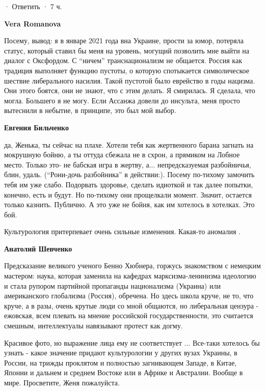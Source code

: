 \begin{itemize}
\begin{itemize}
 · Ответить · 7 ч.

\textbf{Vera Romanova} 

Посему, вывод: я в январе 2021 года вна Украине, прости за юмор, потеряла
статус, который ставил бы меня на уровень, могущий позволить мне выйти на
диалог с Оксфордом. С \enquote{ничем} транснационализм не общается. Россия как традиция
выполняет функцию пустоты, о которую спотыкается символическое шествие
либерального насилия. Такой пустотой было еврейство в годы нацизма. Они этого
боятся, они не знают, что с этим делать. Я смирилась. Я сделала, что могла.
Большего я не могу. Если Ассанжа довели до инсульта, меня просто вытеснили в
небытие, в принципе, это был мой выбор.

\textbf{Евгения Бильченко} 

да, Женька, ты сейчас на плахе. Хотели тебя как жертвенного барана загнать на
мокрушную бойню, а ты оттуда сбежала не в схрон, а прямиком на Лобное место.
Только это- не бабская игра в жертву, а... непредсказуемая
разбойничья, блин, удаль. (\enquote{Рони-дочь разбойника} в действии:). Посему по-тихому
замочить тебя им уже слабо. Подорвать здоровье, сделать идиоткой и так далее
попытки, конечно, есть и будут. Но по-тихому они прощелкали момент. Значит,
остается только казнить. Публично. А это уже не бойня, как им хотелось в
хотелках. Это бой.

\end{itemize} %

Культурология притерпевает очень сильные изменения.
Какая-то аномалия .

\begin{itemize} %
\textbf{Анатолий Шевченко} 

Предсказание великого ученого Бенно Хюбнера, горжусь знакомством с немецким
мастером: наука, которая заменила на кафедрах марксизма-ленинизма идеологию и
стала рупором партийной пропаганды национализма (Украина) или американского
глобализма (Россия), обречена. Но здесь школа круче, не то, что круче, а в
разы, очень крутые люди со мной общаются, но либеральная цензура - ежовская,
всем плевать на мнение российской государственности, это считается смешным,
интеллектуалы навязывают протест как догму.

\end{itemize} %


Красивое фото, но выражение лица ему не соответствует ... Все-таки хотелось бы
узнать - какое значение придают культурологии у других вузах Украины, в России,
на трижды проклятом и полностью загнивающем Западе, в Китае, Японии и дальнем
и среднем Востоке или в Африке и Австралии. Вообще в мире. Просветите, Женя
пожалуйста.

\end{itemize} %
